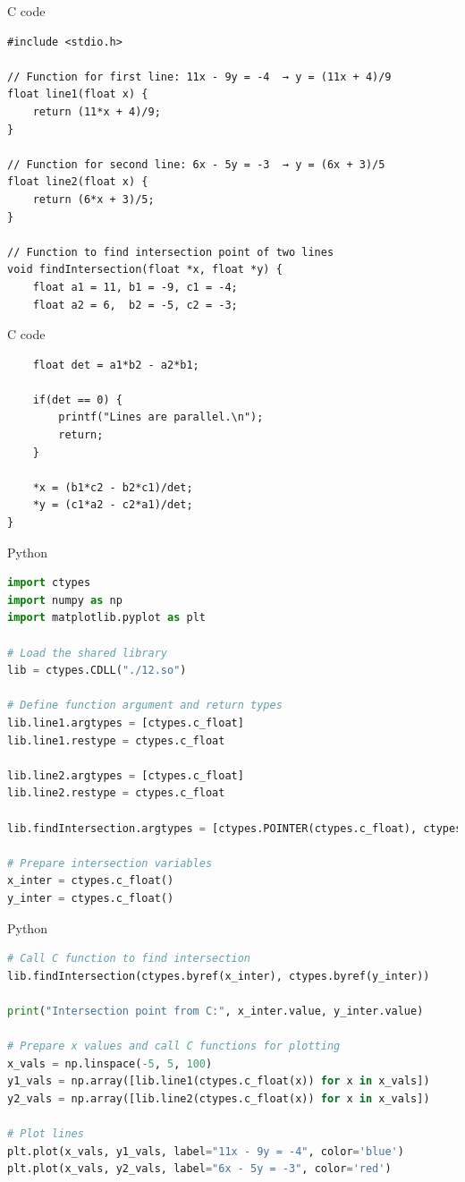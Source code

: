 \documentclass{beamer}
\begin{document}
\begin{frame}[fragile]{C code}
\begin{lstlisting}
#include <stdio.h>

// Function for first line: 11x - 9y = -4  → y = (11x + 4)/9
float line1(float x) {
    return (11*x + 4)/9;
}

// Function for second line: 6x - 5y = -3  → y = (6x + 3)/5
float line2(float x) {
    return (6*x + 3)/5;
}

// Function to find intersection point of two lines
void findIntersection(float *x, float *y) {
    float a1 = 11, b1 = -9, c1 = -4;
    float a2 = 6,  b2 = -5, c2 = -3;

\end{lstlisting}
\end{frame}

\begin{frame}[fragile]{C code}
\begin{lstlisting}
    float det = a1*b2 - a2*b1;

    if(det == 0) {
        printf("Lines are parallel.\n");
        return;
    }

    *x = (b1*c2 - b2*c1)/det;
    *y = (c1*a2 - c2*a1)/det;
}
\end{lstlisting}
\end{frame}
\begin{frame}[fragile]{Python}
\begin{lstlisting}[language=Python]
import ctypes
import numpy as np
import matplotlib.pyplot as plt

# Load the shared library
lib = ctypes.CDLL("./12.so")

# Define function argument and return types
lib.line1.argtypes = [ctypes.c_float]
lib.line1.restype = ctypes.c_float

lib.line2.argtypes = [ctypes.c_float]
lib.line2.restype = ctypes.c_float

lib.findIntersection.argtypes = [ctypes.POINTER(ctypes.c_float), ctypes.POINTER(ctypes.c_float)]

# Prepare intersection variables
x_inter = ctypes.c_float()
y_inter = ctypes.c_float()

\end{lstlisting}
\end{frame}
\begin{frame}[fragile]{Python}
\begin{lstlisting}[language=Python]
# Call C function to find intersection
lib.findIntersection(ctypes.byref(x_inter), ctypes.byref(y_inter))

print("Intersection point from C:", x_inter.value, y_inter.value)

# Prepare x values and call C functions for plotting
x_vals = np.linspace(-5, 5, 100)
y1_vals = np.array([lib.line1(ctypes.c_float(x)) for x in x_vals])
y2_vals = np.array([lib.line2(ctypes.c_float(x)) for x in x_vals])

# Plot lines
plt.plot(x_vals, y1_vals, label="11x - 9y = -4", color='blue')
plt.plot(x_vals, y2_vals, label="6x - 5y = -3", color='red')
\end{lstlisting}
\end{frame}
\end{document}
